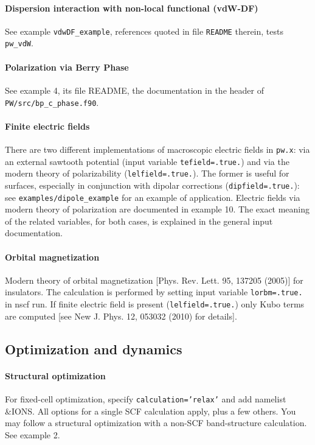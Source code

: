 \documentclass[12pt,a4paper]{article}
\def\pwx{\texttt{pw.x}}
\begin{document}
\paragraph{Dispersion interaction with non-local functional (vdW-DF)}
See example \texttt{vdwDF\_example}, references quoted in file
\texttt{README} therein, tests \texttt{pw\_vdW}.

\paragraph{Polarization via Berry Phase}
See example 4, its file README,  the documentation in the header of 
\texttt{PW/src/bp\_c\_phase.f90}. 

\paragraph{Finite electric fields}
There are two different implementations of macroscopic electric fields
in \pwx: via an external sawtooth potential (input variable
\texttt{tefield=.true.}) and via the modern theory of polarizability
(\texttt{lelfield=.true.}).
The former is useful for surfaces, especially in conjunction
with dipolar corrections (\texttt{dipfield=.true.}):
see \texttt{examples/dipole\_example} for an example of application. 
Electric fields via modern theory of polarization are documented in
example 10. The exact meaning of the related variables, for both
cases, is explained in the general input documentation.

\paragraph{Orbital magnetization}
Modern theory of orbital magnetization [Phys. Rev. Lett. 95, 137205 (2005)]
for insulators. The calculation is performed by setting 
input variable \texttt{lorbm=.true.} in nscf run. If finite electric field 
is present (\texttt{lelfield=.true.}) only Kubo terms are computed
[see New J. Phys. 12, 053032 (2010) for details].

\subsection{Optimization and dynamics}

\paragraph{Structural optimization}
For fixed-cell optimization, specify \texttt{calculation='relax'} and 
add namelist \&IONS. All options for a single SCF calculation apply, 
plus a few others. You may follow a structural optimization with a
non-SCF band-structure calculation. See example 2.
\end{document}
